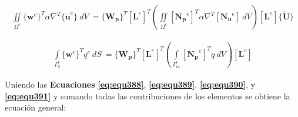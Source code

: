 \begin{ceqn} %
\begin{gather}\label{eq:equ390}
\iint \limits_{\Omega^e}\{\mathbf{w}^e\}^T \alpha \nabla^T \{\mathbf{\dot{u}}^e\}\ dV\ = 
\{\mathbf{W_p}\}^T \left[\mathbf{L}^e\right]^T \left( \iint \limits_{\Omega^e}  [\mathbf{N_p}^e]^T  \alpha \nabla^T [\mathbf{N_u}^e]\ dV \right) \left[\mathbf{L}^e\right]\{\mathbf{\dot{U}}\}
\end{gather}   
\end{ceqn}

\begin{ceqn} %
\begin{gather}\label{eq:equ391}
\int \limits_{\Gamma_{q}^e} \{\mathbf{w}^e\}^T q^e\ dS\ = 
\{\mathbf{W_p}\}^T \left[\mathbf{L}^e\right]^T \left( \int \limits_{\Gamma^e_{tx}} [\mathbf{N_p}^e]^T \overline{q}\ dV \right) \left[\mathbf{L}^e\right]
\end{gather}   
\end{ceqn}

\vspace{0.5cm}
Uniendo las \textbf{Ecuaciones} \textbf{\ref{eq:equ388}}, \textbf{\ref{eq:equ389}}, \textbf{\ref{eq:equ390}}, y \textbf{\ref{eq:equ391}} y sumando todas las contribuciones de los elementos se obtiene la ecuación general:

